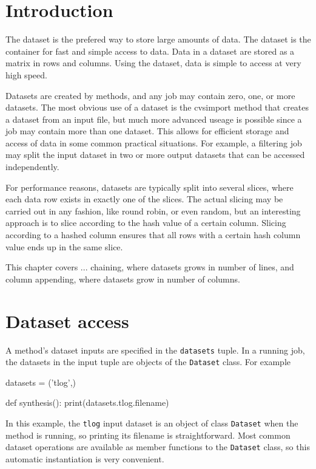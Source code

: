 \section{Introduction}

The dataset is the prefered way to store large amounts of data.  The
dataset is the container for fast and simple access to data.  Data in
a dataset are stored as a matrix in rows and columns.  Using the
dataset, data is simple to access at very high speed.

Datasets are created by methods, and any job may contain zero, one, or
more datasets.  The most obvious use of a dataset is the cvsimport
method that creates a dataset from an input file, but much more
advanced useage is possible since a job may contain more than one
dataset.  This allows for efficient storage and access of data in some
common practical situations.  For example, a filtering job may split
the input dataset in two or more output datasets that can be accessed
independently.

For performance reasons, datasets are typically split into several
slices, where each data row exists in exactly one of the slices.  The
actual slicing may be carried out in any fashion, like round robin, or
even random, but an interesting approach is to slice according to the
hash value of a certain column.  Slicing according to a hashed column
ensures that all rows with a certain hash column value ends up in the
same slice.

This chapter covers ...
chaining, where datasets grows in number of lines, and column
appending, where datasets grow in number of columns.



\section{Dataset access}

A method's dataset inputs are specified in the \texttt{datasets}
tuple.  In a running job, the datasets in the input tuple are objects
of the \texttt{Dataset} class.  For example

\begin{python}
datasets = ('tlog',)

def synthesis():
  print(datasets.tlog.filename)
\end{python}
In this example, the \texttt{tlog} input dataset is an object of class
\texttt{Dataset} when the method is running, so printing its filename
is straightforward.  Most common dataset operations are available as
member functions to the \texttt{Dataset} class, so this automatic
instantiation is very convenient.

